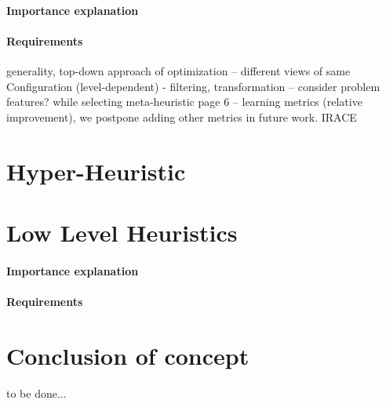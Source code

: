 \paragraph{Importance explanation}
\paragraph{Requirements} generality, top-down approach of optimization
-- different views of same Configuration (level-dependent) - filtering, transformation
-- consider problem features? while selecting meta-heuristic \cite{kerschke2019automated} page 6
-- learning metrics (relative improvement), we postpone adding other metrics in future work.
IRACE\cite{lopez2016irace}

\section{Hyper-Heuristic}

\section{Low Level Heuristics}\label{concept: llh}
\paragraph{Importance explanation}
\paragraph{Requirements}


\section{Conclusion of concept}
to be done...